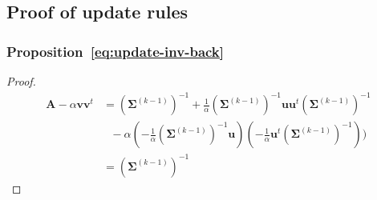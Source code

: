\documentclass[journal,peerreview,onecolumn]{IEEEtran}
\begin{document}
\subsection{Proof of update rules}
    \subsubsection{Proposition~\ref{eq:update-inv-back}}
        \begin{proof}
            \begin{align*}
                \mathbf{A} - \alpha \mathbf{v} \mathbf{v}^t
                &= (\boldsymbol{\Sigma}^{(k-1)})^{-1} + \frac{1}{\alpha} (\boldsymbol{\Sigma}^{(k-1)})^{-1} \mathbf{u} \mathbf{u}^t (\boldsymbol{\Sigma}^{(k-1)})^{-1} \\
                &~~~- \alpha (- \frac{1}{\alpha} (\boldsymbol{\Sigma}^{(k-1)})^{-1} \mathbf{u}) (- \frac{1}{\alpha} \mathbf{u}^t (\boldsymbol{\Sigma}^{(k-1)})^{-1})) \\
                &= (\boldsymbol{\Sigma}^{(k-1)})^{-1}
            \end{align*}
        \end{proof}
\end{document}
